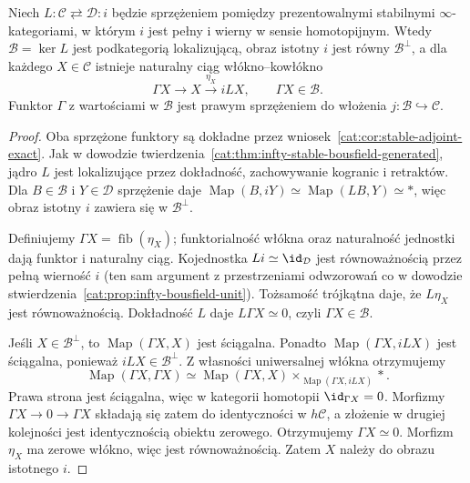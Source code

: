 \begin{stwierdzenie}\label{cat:prop:infty-stable-bousfield-kernel}
Niech $L:\mathcal C\rightleftarrows\mathcal D:i$ będzie sprzężeniem pomiędzy prezentowalnymi stabilnymi $\infty$-kategoriami, w którym $i$ jest pełny i wierny w sensie homotopijnym. Wtedy $\mathcal B=\ker L$ jest podkategorią lokalizującą, obraz istotny $i$ jest równy $\mathcal B^\perp$, a dla każdego $X\in\mathcal C$ istnieje naturalny ciąg włókno--kowłókno
\[
 \Gamma X\longrightarrow X\xrightarrow{\eta_X}iLX,
 \qquad \Gamma X\in\mathcal B.
\]
Funktor $\Gamma$ z wartościami w $\mathcal B$ jest prawym sprzężeniem do włożenia $j:\mathcal B\hookrightarrow\mathcal C$.
\end{stwierdzenie}
\begin{proof}
Oba sprzężone funktory są dokładne przez wniosek~\ref{cat:cor:stable-adjoint-exact}. Jak w dowodzie twierdzenia~\ref{cat:thm:infty-stable-bousfield-generated}, jądro $L$ jest lokalizujące przez dokładność, zachowywanie kogranic i retraktów. Dla $B\in\mathcal B$ i $Y\in\mathcal D$ sprzężenie daje $\operatorname{Map}(B,iY)\simeq\operatorname{Map}(LB,Y)\simeq *$, więc obraz istotny $i$ zawiera się w $\mathcal B^\perp$.

Definiujemy $\Gamma X=\operatorname{fib}(\eta_X)$; funktorialność włókna oraz naturalność jednostki dają funktor i naturalny ciąg. Kojednostka $Li\simeq\id_{\mathcal D}$ jest równoważnością przez pełną wierność $i$ (ten sam argument z przestrzeniami odwzorowań co w dowodzie stwierdzenia~\ref{cat:prop:infty-bousfield-unit}). Tożsamość trójkątna daje, że $L\eta_X$ jest równoważnością. Dokładność $L$ daje $L\Gamma X\simeq0$, czyli $\Gamma X\in\mathcal B$.

Jeśli $X\in\mathcal B^\perp$, to $\operatorname{Map}(\Gamma X,X)$ jest ściągalna. Ponadto $\operatorname{Map}(\Gamma X,iLX)$ jest ściągalna, ponieważ $iLX\in\mathcal B^\perp$. Z własności uniwersalnej włókna otrzymujemy
\[
 \operatorname{Map}(\Gamma X,\Gamma X)
 \simeq
 \operatorname{Map}(\Gamma X,X)
 \times_{\operatorname{Map}(\Gamma X,iLX)} *.
\]
Prawa strona jest ściągalna, więc w kategorii homotopii $\id_{\Gamma X}=0$. Morfizmy $\Gamma X\to0\to\Gamma X$ składają się zatem do identyczności w $h\mathcal C$, a złożenie w drugiej kolejności jest identycznością obiektu zerowego. Otrzymujemy $\Gamma X\simeq0$. Morfizm $\eta_X$ ma zerowe włókno, więc jest równoważnością. Zatem $X$ należy do obrazu istotnego $i$.


\end{proof}

